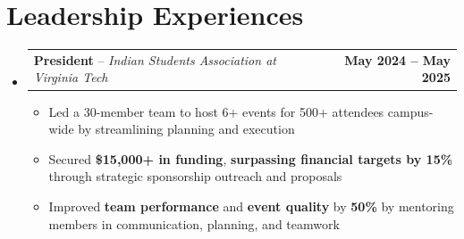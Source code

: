 \documentclass[letterpaper,11pt]{article}
\makeatletter
\newcommand{\resumeItem}[1]{
  \item\small{
    {#1 \vspace{-2pt}}
  }
}
\newcommand{\resumeSubheading}[4]{%
  \vspace{-2pt}\item
    \begin{tabular*}{1.0\textwidth}[t]{l@{\extracolsep{\fill}}r}
      \textbf{#1}{ -- }\textit{\small #3}%
      \ifthenelse{\equal{#4}{}}{}{, \textit{\small #4}}%
      & \textbf{\small #2} \\
    \end{tabular*}\vspace{-7pt}
}
\newcommand{\resumeSubHeadingListStart}{\begin{itemize}[leftmargin=0.0in, label={}]}
\newcommand{\resumeSubHeadingListEnd}{\end{itemize}}
\newcommand{\resumeItemListStart}{\begin{itemize}}
\newcommand{\resumeItemListEnd}{\end{itemize}\vspace{-5pt}}
\makeatother
\begin{document}
\section{Leadership Experiences}
    \resumeSubHeadingListStart
        \resumeSubheading
            {President}{May 2024 -- May 2025}
            {Indian Students Association at Virginia Tech}{Blacksburg, VA}
            \resumeItemListStart
                \resumeItem{Led a 30-member team to host 6+ events for 500+ attendees campus-wide by streamlining planning and execution}
                \resumeItem{Secured \textbf{\$15,000+ in funding}, \textbf{surpassing financial targets by 15\%} through strategic sponsorship outreach and proposals}
                \resumeItem{Improved \textbf{team performance} and \textbf{event quality} by \textbf{50\%} by mentoring members in communication, planning, and teamwork}
            \resumeItemListEnd        
    \resumeSubHeadingListEnd

\end{document}
